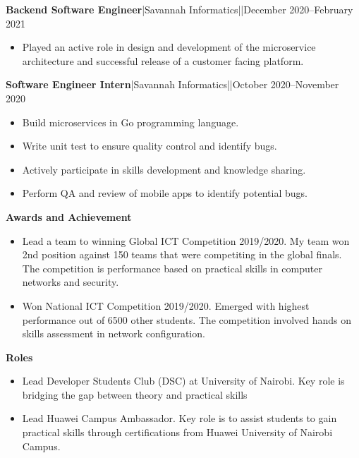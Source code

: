 \documentclass[a4paper]{article}
\begin{document}
\textbf{Backend Software Engineer}|Savannah Informatics||December 2020--February 2021

\begin{itemize}[noitemsep]
    \item Played an active role in design and development of the microservice architecture and successful release of a customer facing platform.
\end{itemize}

\textbf{Software Engineer Intern}|Savannah Informatics||October 2020--November 2020

\begin{itemize}[noitemsep]
    \item Build microservices in Go programming language.
    \item Write unit test to ensure quality control and identify bugs.
    \item Actively participate in skills development and knowledge sharing.
    \item Perform QA and review of mobile apps to identify potential bugs.
\end{itemize}

\begin{center}
    {\Large \textbf{Awards and Achievement}}
\end{center}

\begin{itemize}[noitemsep]
    \item Lead a team to winning Global ICT Competition 2019/2020. My team won 2nd position against 150 teams that were competiting in the global finals. The competition is performance based on practical skills in computer networks and security.
    \item Won National ICT Competition 2019/2020. Emerged with highest performance out of 6500 other students. The competition involved hands on skills assessment in network configuration.
\end{itemize}

\begin{center}
    {\Large \textbf{Roles}}
\end{center}

\begin{itemize}[noitemsep]
    \item Lead Developer Students Club (DSC) at University of Nairobi. Key role is bridging the gap between theory and practical skills
    \item Lead Huawei Campus Ambassador. Key role is to assist students to gain practical skills through certifications from Huawei University of Nairobi Campus.
\end{itemize}
\end{document}
